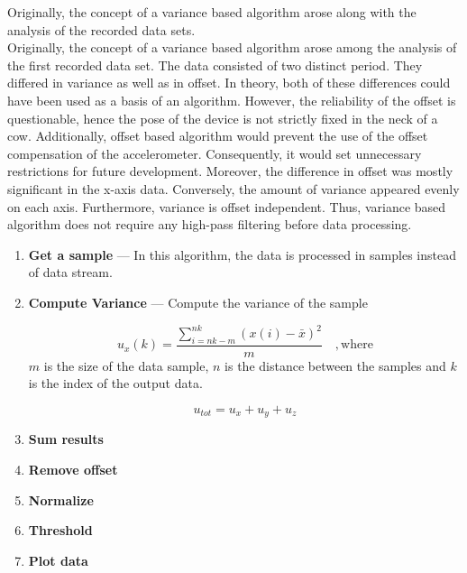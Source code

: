\documentclass[english,12pt,a4paper,pdftex,elec,utf8]{aaltothesis}
\begin{document}
Originally, the concept of a variance based algorithm arose along with the analysis of the recorded data sets.  \\


Originally, the concept of a variance based algorithm arose among the analysis of the first recorded data set. The data consisted of two distinct period. They differed in variance as well as in offset. In theory, both of these differences could have been used as a basis of an algorithm. However, the reliability of the offset is questionable, hence the pose of the device is not strictly fixed in the neck of a cow. Additionally, offset based algorithm would prevent the use of the offset compensation of the accelerometer. Consequently, it would set unnecessary restrictions for future development. Moreover, the difference in offset was mostly significant in the x-axis data. Conversely, the amount of variance appeared evenly on each axis. Furthermore, variance is offset independent. Thus, variance based algorithm does not require any high-pass filtering before data processing. \\

\begin{enumerate}

\item \textbf{Get a sample} --- In this algorithm, the data is processed in samples instead of data stream. 

\item \textbf{Compute Variance} --- Compute the variance of the sample

\begin{equation} \label{samplevariance}
u_x(k) = \frac{\sum \limits_{i=nk-m}^{nk} (x(i) - \bar{x})^2}{m} \mathrm{\hspace{1em}, where}
\end{equation}
$m$ is the size of the data sample, $n$ is the distance between the samples and $k$ is the index of the output data. 

\begin{equation}
u_{tot} = u_x + u_y + u_z
\end{equation}

\item \textbf{Sum results}
\item \textbf{Remove offset}
\item \textbf{Normalize}
\item \textbf{Threshold}
\item \textbf{Plot data}

\end{enumerate}
\end{document}
